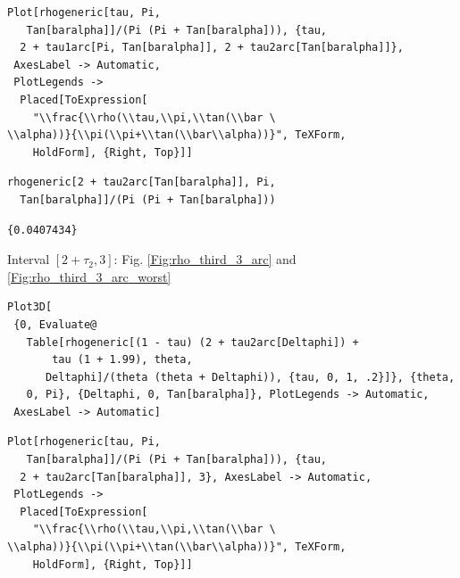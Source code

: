 \documentclass[reqno]{amsart}
\theoremstyle{definition} \newtheorem{definition}{Definition}[section]
\theoremstyle{definition} \newtheorem{remark}[definition]{Remark}
\theoremstyle{plain} \newtheorem{lemma}[definition]{Lemma}
\theoremstyle{plain} \newtheorem{proposition}[definition]{Proposition}
\theoremstyle{plain} \newtheorem{theorem}[definition]{Theorem}
\theoremstyle{plain} \newtheorem{corollary}[definition]{Corollary}
\theoremstyle{definition} \newtheorem{example}[definition]{Example}
\theoremstyle{plain} \newtheorem{claim}[clai]{Claim}
\theoremstyle{definition} \newtheorem{assumption}[definition]{Assumption}
\theoremstyle{definition} \newtheorem{observation}[definition]{Observation}
\newcommand{\1}{\mathbbm 1}
\newcommand{\smed}{\medskip}
\numberwithin{equation}{section} %
\theoremstyle{plain} \newtheorem*{theorem*}{Theorem}
\theoremstyle{plain} \newtheorem{mthm}[maintheorem]{Main Theorem}
\theoremstyle{plain} \newtheorem*{mthm*}{Main Theorem}
\theoremstyle{plain} \newtheorem*{conjecture*}{Conjecture}
\theoremstyle{plain} \newtheorem{conjecture}[definition]{Conjecture}
\theoremstyle{plain} \newtheorem*{problem*}{Problem}
\begin{document}
\begin{verbatim}
Plot[rhogeneric[tau, Pi, 
   Tan[baralpha]]/(Pi (Pi + Tan[baralpha])), {tau, 
  2 + tau1arc[Pi, Tan[baralpha]], 2 + tau2arc[Tan[baralpha]]}, 
 AxesLabel -> Automatic, 
 PlotLegends -> 
  Placed[ToExpression[
    "\\frac{\\rho(\\tau,\\pi,\\tan(\\bar \
\\alpha))}{\\pi(\\pi+\\tan(\\bar\\alpha))}", TeXForm, 
    HoldForm], {Right, Top}]]
\end{verbatim}
\begin{verbatim}
rhogeneric[2 + tau2arc[Tan[baralpha]], Pi, 
  Tan[baralpha]]/(Pi (Pi + Tan[baralpha]))
\end{verbatim}
\begin{verbatim}
{0.0407434}
\end{verbatim}
\smed
Interval $[2+\tau_2,3]$: Fig. \ref{Fig:rho_third_3_arc} and \ref{Fig:rho_third_3_arc_worst}
\smed
\begin{verbatim}
Plot3D[
 {0, Evaluate@
   Table[rhogeneric[(1 - tau) (2 + tau2arc[Deltaphi]) + 
       tau (1 + 1.99), theta, 
      Deltaphi]/(theta (theta + Deltaphi)), {tau, 0, 1, .2}]}, {theta,
   0, Pi}, {Deltaphi, 0, Tan[baralpha]}, PlotLegends -> Automatic, 
 AxesLabel -> Automatic]
\end{verbatim}
\begin{verbatim}
Plot[rhogeneric[tau, Pi, 
   Tan[baralpha]]/(Pi (Pi + Tan[baralpha])), {tau, 
  2 + tau2arc[Tan[baralpha]], 3}, AxesLabel -> Automatic, 
 PlotLegends -> 
  Placed[ToExpression[
    "\\frac{\\rho(\\tau,\\pi,\\tan(\\bar \
\\alpha))}{\\pi(\\pi+\\tan(\\bar\\alpha))}", TeXForm, 
    HoldForm], {Right, Top}]]
\end{verbatim}
\end{document}
